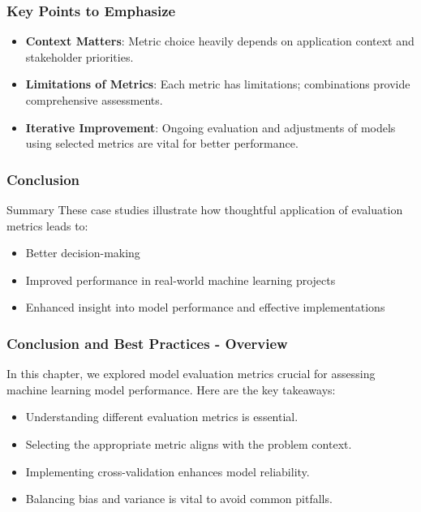 \documentclass{beamer}
\begin{document}
\begin{frame}[fragile]
    \frametitle{Key Points to Emphasize}
    \begin{itemize}
        \item \textbf{Context Matters}: Metric choice heavily depends on application context and stakeholder priorities.
        \item \textbf{Limitations of Metrics}: Each metric has limitations; combinations provide comprehensive assessments.
        \item \textbf{Iterative Improvement}: Ongoing evaluation and adjustments of models using selected metrics are vital for better performance.
    \end{itemize}
\end{frame}

\begin{frame}[fragile]
    \frametitle{Conclusion}
    \begin{block}{Summary}
        These case studies illustrate how thoughtful application of evaluation metrics leads to:
    \end{block}
    \begin{itemize}
        \item Better decision-making
        \item Improved performance in real-world machine learning projects
        \item Enhanced insight into model performance and effective implementations
    \end{itemize}
\end{frame}

\begin{frame}[fragile]
    \frametitle{Conclusion and Best Practices - Overview}
    In this chapter, we explored model evaluation metrics crucial for assessing machine learning model performance. Here are the key takeaways:

    \begin{itemize}
        \item Understanding different evaluation metrics is essential.
        \item Selecting the appropriate metric aligns with the problem context.
        \item Implementing cross-validation enhances model reliability.
        \item Balancing bias and variance is vital to avoid common pitfalls.
    \end{itemize}
\end{frame}
\end{document}
